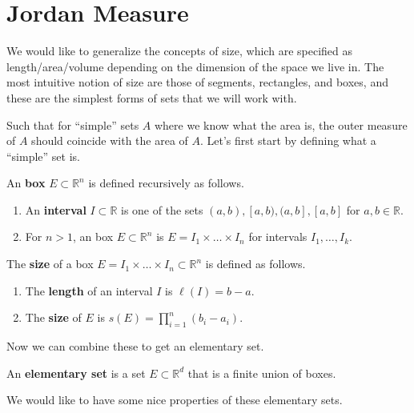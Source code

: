 \section{Jordan Measure}

  We would like to generalize the concepts of size, which are specified as length/area/volume depending on the dimension of the space we live in. The most intuitive notion of size are those of segments, rectangles, and boxes, and these are the simplest forms of sets that we will work with. 

  Such that for ``simple'' sets $A$ where we know what the area is, the outer measure of $A$ should coincide with the area of $A$. Let's first start by defining what a ``simple'' set is. 

  \begin{definition}[Box] 
    An \textbf{box} $E \subset \mathbb{R}^n$ is defined recursively as follows. 
    \begin{enumerate}
      \item An \textbf{interval} $I \subset \mathbb{R}$ is one of the sets $(a, b), [a, b), (a, b], [a, b]$ for $a, b \in \mathbb{R}$. 
      \item For $n > 1$, an box $E \subset \mathbb{R}^n$ is $E = I_1 \times \ldots \times I_n$ for intervals $I_1, \ldots, I_k$. 
    \end{enumerate}
  \end{definition} 

  \begin{definition}
    The \textbf{size} of a box $E = I_1 \times \ldots \times I_n \subset \mathbb{R}^n$ is defined as follows. 
    \begin{enumerate}
      \item The \textbf{length} of an interval $I$ is $\ell(I) = b - a$. 
      \item The \textbf{size} of $E$ is $s(E) = \prod_{i=1}^n (b_i - a_i)$. 
    \end{enumerate}
  \end{definition} 

  Now we can combine these to get an elementary set. 

  \begin{definition}
    An \textbf{elementary set} is a set $E \subset \mathbb{R}^d$ that is a finite union of boxes. 
  \end{definition}

  We would like to have some nice properties of these elementary sets. 

